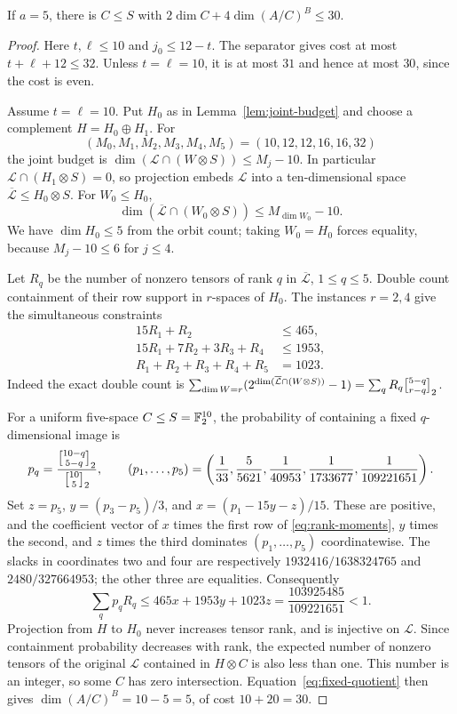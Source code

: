 \begin{theorem}\label{thm:binary32-capacity}
If $a=5$, there is $C\leq S$ with
$2\dim C+4\dim(A/C)^B\leq30$.
\end{theorem}
\begin{proof}
Here $t,\ell\leq10$ and $j_0\leq12-t$. The separator gives cost at
most $t+\ell+12\leq32$. Unless $t=\ell=10$, it is at most $31$
and hence at most $30$, since the cost is even.

Assume $t=\ell=10$. Put $H_0$ as in Lemma~\ref{lem:joint-budget}
and choose a complement $H=H_0\oplus H_1$. For
\[
 (M_0,M_1,M_2,M_3,M_4,M_5)=(10,12,12,16,16,32)
\]
the joint budget is $\dim(\mathcal L\cap(W\otimes S))\leq M_j-10$.
In particular $\mathcal L\cap(H_1\otimes S)=0$, so projection embeds
$\mathcal L$ into a ten-dimensional space
$\overline{\mathcal L}\leq H_0\otimes S$. For $W_0\leq H_0$,
\[
 \dim(\overline{\mathcal L}\cap(W_0\otimes S))
 \leq M_{\dim W_0}-10.
\]
We have $\dim H_0\leq5$ from the orbit count; taking $W_0=H_0$
forces equality, because $M_j-10\leq6$ for $j\leq4$.

Let $R_q$ be the number of nonzero tensors of rank $q$ in
$\overline{\mathcal L}$, $1\leq q\leq5$. Double count containment
of their row support in $r$-spaces of $H_0$. The instances $r=2,4$
give the simultaneous constraints
\begin{equation}\label{eq:rank-moments}
 \begin{split}
 15R_1+R_2&\leq465,\\
 15R_1+7R_2+3R_3+R_4&\leq1953,\\
 R_1+R_2+R_3+R_4+R_5&=1023.
 \end{split}
\end{equation}
Indeed the exact double count is
$\sum_{\dim W=r}(2^{\dim(\overline{\mathcal L}\cap(W\otimes S))}-1)
=\sum_qR_q\gauss{5-q}{r-q}2$.

For a uniform five-space $C\leq S=\mathbb F_2^{10}$, the probability of
containing a fixed $q$-dimensional image is
\[
 p_q=\frac{\gauss{10-q}{5-q}2}{\gauss{10}52},\qquad
 (p_1,\ldots,p_5)=
 \left(\frac1{33},\frac5{5621},\frac1{40953},
       \frac1{1733677},\frac1{109221651}\right).
\]
Set $z=p_5$, $y=(p_3-p_5)/3$, and $x=(p_1-15y-z)/15$.
These are positive, and the coefficient vector of $x$ times the first
row of \eqref{eq:rank-moments}, $y$ times the second, and $z$ times
the third dominates $(p_1,\ldots,p_5)$ coordinatewise. The slacks in
coordinates two and four are respectively
$1932416/1638324765$ and $2480/327664953$; the other three are equalities.
Consequently
\begin{equation}\label{eq:positive-dual}
 \sum_qp_qR_q\leq465x+1953y+1023z
 =\frac{103925485}{109221651}<1.
\end{equation}
Projection from $H$ to $H_0$ never increases tensor rank, and is
injective on $\mathcal L$. Since containment probability decreases
with rank, the expected number of nonzero tensors of the original
$\mathcal L$ contained in $H\otimes C$ is also less than one.
This number is an integer, so some $C$ has zero intersection.
Equation~\eqref{eq:fixed-quotient} then gives
$\dim(A/C)^B=10-5=5$, of cost $10+20=30$.
\end{proof}

